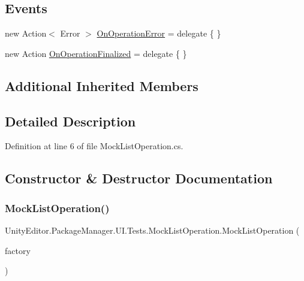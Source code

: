 \subsection*{Events}
\begin{DoxyCompactItemize}
\item 
new Action$<$ Error $>$ \mbox{\hyperlink{class_unity_editor_1_1_package_manager_1_1_u_i_1_1_tests_1_1_mock_list_operation_a4c00468527431a5933faecd3a69afb23}{On\+Operation\+Error}} = delegate \{ \}
\item 
new Action \mbox{\hyperlink{class_unity_editor_1_1_package_manager_1_1_u_i_1_1_tests_1_1_mock_list_operation_a109369ca9422c09cbd910623889c9771}{On\+Operation\+Finalized}} = delegate \{ \}
\end{DoxyCompactItemize}
\subsection*{Additional Inherited Members}


\subsection{Detailed Description}


Definition at line 6 of file Mock\+List\+Operation.\+cs.



\subsection{Constructor \& Destructor Documentation}
\mbox{\label{class_unity_editor_1_1_package_manager_1_1_u_i_1_1_tests_1_1_mock_list_operation_a5289d882cb48663181dbe90adfe496ba}} 
\subsubsection{\texorpdfstring{MockListOperation()}{MockListOperation()}}
{\footnotesize\ttfamily Unity\+Editor.\+Package\+Manager.\+U\+I.\+Tests.\+Mock\+List\+Operation.\+Mock\+List\+Operation (\begin{DoxyParamCaption}\item[{\mbox{\hyperlink{class_unity_editor_1_1_package_manager_1_1_u_i_1_1_tests_1_1_mock_operation_factory}{Mock\+Operation\+Factory}}}]{factory }\end{DoxyParamCaption})}



